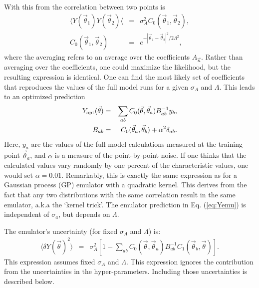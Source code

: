 \documentclass[UserManual.tex]{subfiles}
\begin{document}
With this from the correlation between two points is
\begin{eqnarray}
\langle Y(\vec{\theta}_1)Y(\vec{\theta}_2)\langle &=& \sigma_A^2 C_0(\vec{\theta}_1,\vec{\theta}_2),\\
\nonumber
C_0(\vec{\theta}_1,\vec{\theta}_2)&=&e^{-|\vec{\theta}_1-\vec{\theta}_2|^2/2\Lambda^2},
\end{eqnarray}
where the averaging refers to an average over the coefficients $A_{\vec{n}}$. Rather than averaging over the coefficients, one could maximize the likelihood, but the resulting expression is identical. One can find the most likely set of coefficients that reproduces the values of the full model runs for a given $\sigma_A$ and $\Lambda$. This leads to an optimized prediction
\begin{eqnarray}\label{eq:Yemu}
Y_{\rm opt}(\vec{\theta})&=&\sum_{ab}C_0(\vec{\theta},\vec{\theta}_a)B^{-1}_{ab}y_b,\\
\label{eq:Bdef}
B_{ab}&=&C_0(\vec{\theta}_a,\vec{\theta}_b)+\alpha^2\delta_{ab}.
\end{eqnarray}
Here, $y_a$ are the values of the full model calculations measured at the training point $\vec{\theta}_a$, and $\alpha$ is a measure of the point-by-point noise. If one thinks that the calculated values vary randomly by one percent of the characteristic values, one would set $\alpha=0.01$. Remarkably, this is exactly the same expression as for a Gaussian process (GP) emulator with a quadratic kernel. This derives from the fact that any two distributions with the same correlation result in the same emulator, a.k.a the `kernel trick'.  The emulator prediction in Eq. (\ref{eq:Yemu}) is independent of $\sigma_a$, but depends on $\Lambda$. 

The emulator's uncertainty (for fixed $\sigma_A$ and $\Lambda$) is:
\begin{eqnarray}
\langle \delta Y(\vec{\theta})^2\rangle&=&
\sigma_A^2\left[1-\sum_{ab}C_0(\vec{\theta},\vec{\theta}_a)B^{-1}_{ab}C_1(\vec{\theta}_b,\vec{\theta})\right].
\end{eqnarray}
This expression assumes fixed $\sigma_A$ and $\Lambda$. This expression ignores the contribution from the uncertainties in the hyper-parameters. Including those uncertainties is described below.
\end{document}
